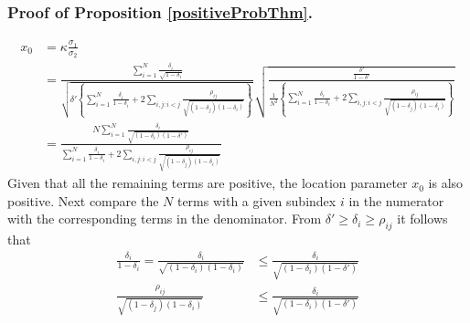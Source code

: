 \documentclass[11pt]{article}
\theoremstyle{definition}
\theoremstyle{definition}
\begin{document}
\subsubsection{Proof of Proposition \ref{positiveProbThm}.}
\begin{align*}
x_0 &= \kappa \frac{\sigma_1}{\sigma_2} \\
 &= \frac{ \sum_{i=1}^N \frac{\delta_i}{\sqrt{1-\delta_i}}}{\sqrt{\delta'  \left\{ \sum_{i=1}^N \frac{\delta_i}{1-\delta_i} + 2 \sum_{i,j: i<j} \frac{\rho_{ij}}{\sqrt{(1-\delta_j)(1-\delta_i)}}\right\}}} \sqrt{\frac{\frac{\delta'}{1-\delta'}}{\frac{1}{N^2} \left\{ \sum_{i=1}^N \frac{\delta_i}{1-\delta_i} + 2 \sum_{i,j: i<j} \frac{\rho_{ij}}{\sqrt{(1-\delta_j)(1-\delta_i)}}\right\} }}\\
&=  \frac{N \sum_{i=1}^N \frac{\delta_i}{\sqrt{(1-\delta_i)(1-\delta')}}}{ \sum_{i=1}^N \frac{\delta_i}{1-\delta_i} + 2 \sum_{i,j: i<j} \frac{\rho_{ij}}{\sqrt{(1-\delta_j)(1-\delta_i)}}}
\end{align*}
Given that all the remaining terms are positive, the location parameter $x_0$ is also positive. Next compare the $N$ terms with a given subindex $i$ in the numerator with the corresponding terms in the denominator. From $\delta' \geq \delta_i \geq \rho_{ij}$ it follows that 
\begin{align}
\frac{\delta_i}{1-\delta_i} = \frac{\delta_i}{\sqrt{(1-\delta_i)(1-\delta_i)}} &\leq \frac{\delta_i}{\sqrt{(1-\delta_i)(1-\delta')}} \label{ProofIneq1}\\
 \frac{\rho_{ij}}{\sqrt{(1-\delta_j)(1-\delta_i)}} &\leq \frac{\delta_i}{\sqrt{(1-\delta_i)(1-\delta')}} \label{ProofIneq2}
\end{align}
\end{document}
